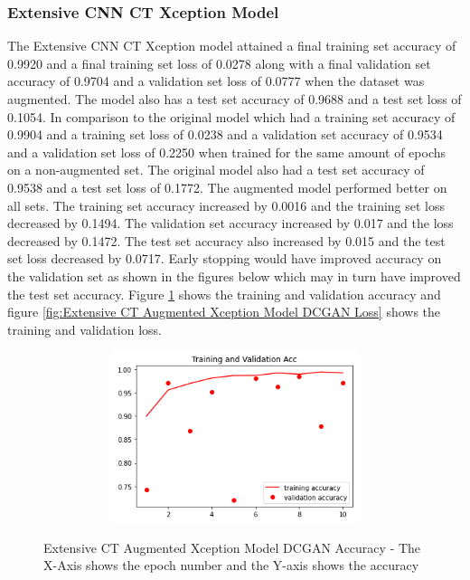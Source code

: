 \subsubsection{Extensive CNN CT Xception Model}
The Extensive CNN CT Xception model attained a final training set accuracy of 0.9920 and a final training set loss of 0.0278 along with a final validation set accuracy of 0.9704 and a validation set loss of 0.0777 when the dataset was augmented.  The model also has a test set accuracy of 0.9688 and a test set loss of 0.1054.  In comparison to the original model which had a training set accuracy of 0.9904  and a training set loss of 0.0238 and a validation set accuracy of 0.9534 and a validation set loss of 0.2250 when trained for the same amount of epochs on a non-augmented set.  The original model also had a test set accuracy of 0.9538 and a test set loss of 0.1772.  The augmented model performed better on all sets.  The training set accuracy increased by 0.0016 and the training set loss decreased by 0.1494. The validation set accuracy increased by 0.017 and the loss decreased by 0.1472. The test set accuracy also increased by 0.015 and the test set loss decreased by 0.0717.  Early stopping would have improved accuracy on the validation set as shown in the figures below which may in turn have improved the test set accuracy.  Figure \ref{fig:Extensive CT Augmented Xception Model DCGAN Accuracy} shows the training and validation accuracy and figure \ref{fig:Extensive CT Augmented Xception Model DCGAN Loss} shows the training and validation loss.
 \begin{figure}[H]
    \centering    \includegraphics[width=1\textwidth,height=5cm,keepaspectratio]{Images/XceptionBaselineTrainingValidationAccuracyExtensiveCTAugmentedDCGAN.png}\\
    \caption{Extensive CT Augmented Xception Model DCGAN Accuracy - The X-Axis shows the epoch number and the Y-axis shows the accuracy}
    \label{fig:Extensive CT Augmented Xception Model DCGAN Accuracy}
\end{figure}
